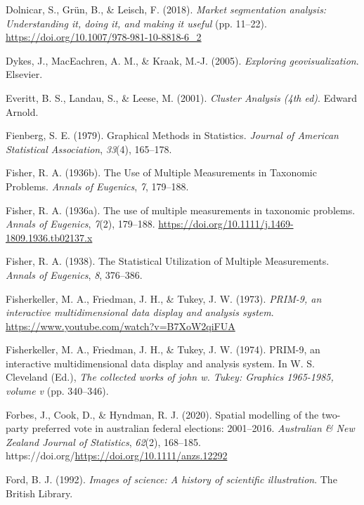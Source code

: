 \documentclass[
  letterpaper,
]{krantz}
\newlength{\cslhangindent}
\newenvironment{CSLReferences}[2] %
 {\begin{list}{}{%
  \setlength{\itemindent}{0pt}
  \setlength{\leftmargin}{0pt}
  \setlength{\parsep}{0pt}
  \ifodd #1
   \setlength{\leftmargin}{\cslhangindent}
   \setlength{\itemindent}{-1\cslhangindent}
  \fi
  \setlength{\itemsep}{#2\baselineskip}}}
 {\end{list}}
\begin{document}
\begin{CSLReferences}{1}{0}
Dolnicar, S., Grün, B., \& Leisch, F. (2018). \emph{Market segmentation
analysis: Understanding it, doing it, and making it useful} (pp.
11--22). \url{https://doi.org/10.1007/978-981-10-8818-6_2}

Dykes, J., MacEachren, A. M., \& Kraak, M.-J. (2005). \emph{Exploring
geovisualization}. Elsevier.

Everitt, B. S., Landau, S., \& Leese, M. (2001). \emph{Cluster
{A}nalysis (4th ed)}. Edward Arnold.

Fienberg, S. E. (1979). Graphical {M}ethods in {S}tatistics.
\emph{Journal of American Statistical Association}, \emph{33}(4),
165--178.

Fisher, R. A. (1936b). The {U}se of {M}ultiple {M}easurements in
{T}axonomic {P}roblems. \emph{Annals of Eugenics}, \emph{7}, 179--188.

Fisher, R. A. (1936a). The use of multiple measurements in taxonomic
problems. \emph{Annals of Eugenics}, \emph{7}(2), 179--188.
\url{https://doi.org/10.1111/j.1469-1809.1936.tb02137.x}

Fisher, R. A. (1938). The {S}tatistical {U}tilization of {M}ultiple
{M}easurements. \emph{Annals of Eugenics}, \emph{8}, 376--386.

Fisherkeller, M. A., Friedman, J. H., \& Tukey, J. W. (1973).
\emph{{PRIM-9}, an interactive multidimensional data display and
analysis system}. \url{https://www.youtube.com/watch?v=B7XoW2qiFUA}

Fisherkeller, M. A., Friedman, J. H., \& Tukey, J. W. (1974). {PRIM-9},
an interactive multidimensional data display and analysis system. In W.
S. Cleveland (Ed.), \emph{The collected works of john w. Tukey: Graphics
1965-1985, volume v} (pp. 340--346).

Forbes, J., Cook, D., \& Hyndman, R. J. (2020). Spatial modelling of the
two-party preferred vote in australian federal elections: 2001--2016.
\emph{Australian \& New Zealand Journal of Statistics}, \emph{62}(2),
168--185. https://doi.org/\url{https://doi.org/10.1111/anzs.12292}

Ford, B. J. (1992). \emph{Images of science: A history of scientific
illustration}. The British Library.


\end{CSLReferences}
\end{document}
